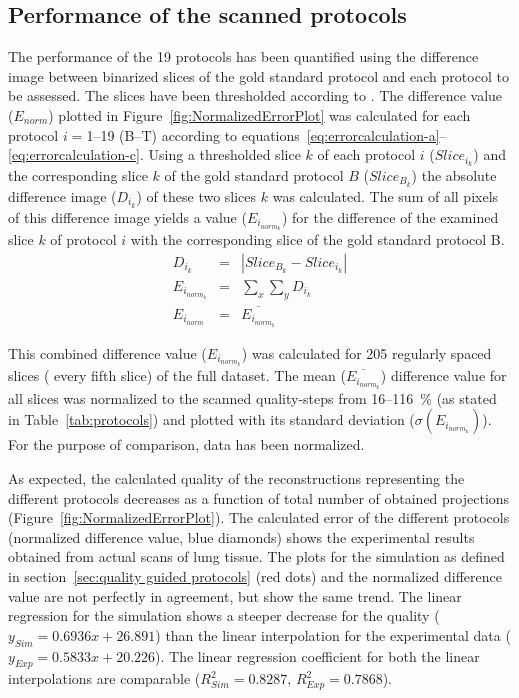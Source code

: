 \subsection{Performance of the scanned protocols}
The performance of the 19 protocols has been quantified using the difference image between binarized slices of the gold standard protocol and each protocol to be assessed. The slices have been thresholded according to \citet{Otsu1979}. The difference value ($E_{norm}$) plotted in Figure~\ref{fig:NormalizedErrorPlot} was calculated for each protocol $i=$1--19 (B--T) according to equations~\ref{eq:errorcalculation-a}--\ref{eq:errorcalculation-c}. Using a thresholded slice $k$ of each protocol $i$ ($Slice_{i_{k}}$) and the corresponding slice $k$ of the gold standard protocol $B$ ($Slice_{B_{k}}$) the absolute difference image ($D_{i_{k}}$) of these two slices $k$ was calculated. The sum of all pixels of this difference image yields a value ($E_{i_{norm_{k}}}$) for the difference of the examined slice $k$ of protocol $i$ with the corresponding slice of the gold standard protocol B.
\begin{eqnarray}
	D_{i_{k}} &=& |Slice_{B_{k}}-Slice_{i_{k}}|\label{eq:errorcalculation-a}\\%
	E_{i_{norm_{k}}} &=& \sum_{x}\sum_{y} D_{i_{k}}\label{eq:errorcalculation-b}\\%
	E_{i_{norm}} &=& \overline{E_{i_{norm_{k}}}}\label{eq:errorcalculation-c}%
\end{eqnarray}

This combined difference value ($E_{i_{norm_{k}}}$) was calculated for 205 regularly spaced slices (%
every fifth slice) of the full dataset. The mean ($\overline{E_{i_{norm_{k}}}}$) difference value for all slices was normalized to the scanned quality-steps from 16--\SI{116}{\percent} (as stated in Table~\ref{tab:protocols}) and plotted with its standard deviation ($\sigma(E_{i_{norm_{k}}})$). For the purpose of comparison, data has been normalized.

As expected, the calculated quality of the reconstructions representing the different protocols decreases as a function of total number of obtained projections (Figure~\ref{fig:NormalizedErrorPlot}). The calculated error of the different protocols (normalized difference value, blue diamonds) shows the experimental results obtained from actual scans of lung tissue. The plots for the simulation as defined in section~\ref{sec:quality guided protocols} (red dots) and the normalized difference value are not perfectly in agreement, but show the same trend. The linear regression for the simulation shows a steeper decrease for the quality ($y_{Sim}=0.6936x+26.891$) than the linear interpolation for the experimental data ($y_{Exp}=0.5833x+20.226$). The linear regression coefficient for both the linear interpolations are comparable ($R^{2}_{Sim}=0.8287$, $R^{2}_{Exp}=0.7868$).

